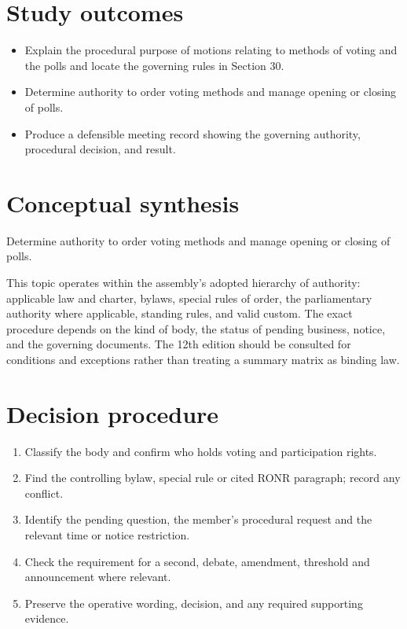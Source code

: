 \documentclass[11pt]{article}
\begin{document}
\SuiteOpen
{}
\section{Study outcomes}
\begin{itemize}[leftmargin=*,itemsep=4pt]
\item Explain the procedural purpose of motions relating to methods of voting and the polls and locate the governing rules in Section 30.
\item Determine authority to order voting methods and manage opening or closing of polls.
\item Produce a defensible meeting record showing the governing authority, procedural decision, and result.
\end{itemize}

\section{Conceptual synthesis}
Determine authority to order voting methods and manage opening or closing of polls.

This topic operates within the assembly’s adopted hierarchy of authority: applicable law and charter, bylaws, special rules of order, the parliamentary authority where applicable, standing rules, and valid custom. The exact procedure depends on the kind of body, the status of pending business, notice, and the governing documents. The 12th edition should be consulted for conditions and exceptions rather than treating a summary matrix as binding law.
\section{Decision procedure}
\begin{enumerate}[leftmargin=*,itemsep=4pt]
\item Classify the body and confirm who holds voting and participation rights.
\item Find the controlling bylaw, special rule or cited RONR paragraph; record any conflict.
\item Identify the pending question, the member’s procedural request and the relevant time or notice restriction.
\item Check the requirement for a second, debate, amendment, threshold and announcement where relevant.
\item Preserve the operative wording, decision, and any required supporting evidence.
\end{enumerate}
\end{document}
